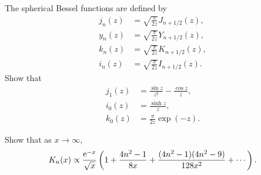 {%
\begin{Exercise}
  The spherical Bessel functions are defined by
  \begin{align*}
    j_n(z) &= \sqrt{ \frac{\pi}{2 z} } J_{n+1/2}(z),
    \\
    y_n(z) &= \sqrt{ \frac{\pi}{2 z} } Y_{n+1/2}(z),
    \\
    k_n(z) &= \sqrt{ \frac{\pi}{2 z} } K_{n+1/2}(z),
    \\
    i_n(z) &= \sqrt{ \frac{\pi}{2 z} } I_{n+1/2}(z).
  \end{align*}
  Show that
  \begin{align*}
    j_1(z)&= \frac{\sin z}{z^2} - \frac{\cos z}{z}, 
    \\
    i_0(z)&= \frac{\sinh z}{z},  
    \\
    k_0(z)&= \frac{\pi}{2 z} \exp(-z).
  \end{align*}
\end{Exercise}





\begin{Exercise}
  Show that as $x \to \infty$,
  \[
  K_n(x) \propto \frac{\mathop{\mathrm{e}}\nolimits^{-x}}{\sqrt{x}} \left( 1 + \frac{4n^2-1}{8x}
    + \frac{(4 n^2 - 1)(4n^2 - 9)}{128 x^2} + \cdots \right).
  \]
\end{Exercise}







\raggedbottom
}
